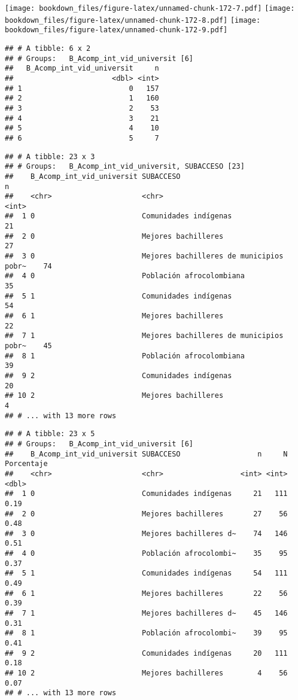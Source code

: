 \documentclass[]{article}
\theoremstyle{definition}
\theoremstyle{definition}
\theoremstyle{definition}
\theoremstyle{remark}
\begin{document}
\texttt{[image: bookdown\_files/figure-latex/unnamed-chunk-172-7.pdf]}
\texttt{[image: bookdown\_files/figure-latex/unnamed-chunk-172-8.pdf]}
\texttt{[image: bookdown\_files/figure-latex/unnamed-chunk-172-9.pdf]}

\begin{verbatim}
## # A tibble: 6 x 2
## # Groups:   B_Acomp_int_vid_universit [6]
##   B_Acomp_int_vid_universit     n
##                       <dbl> <int>
## 1                         0   157
## 2                         1   160
## 3                         2    53
## 4                         3    21
## 5                         4    10
## 6                         5     7
\end{verbatim}

\begin{verbatim}
## # A tibble: 23 x 3
## # Groups:   B_Acomp_int_vid_universit, SUBACCESO [23]
##    B_Acomp_int_vid_universit SUBACCESO                                   n
##    <chr>                     <chr>                                   <int>
##  1 0                         Comunidades indígenas                      21
##  2 0                         Mejores bachilleres                        27
##  3 0                         Mejores bachilleres de municipios pobr~    74
##  4 0                         Población afrocolombiana                   35
##  5 1                         Comunidades indígenas                      54
##  6 1                         Mejores bachilleres                        22
##  7 1                         Mejores bachilleres de municipios pobr~    45
##  8 1                         Población afrocolombiana                   39
##  9 2                         Comunidades indígenas                      20
## 10 2                         Mejores bachilleres                         4
## # ... with 13 more rows
\end{verbatim}

\begin{verbatim}
## # A tibble: 23 x 5
## # Groups:   B_Acomp_int_vid_universit [6]
##    B_Acomp_int_vid_universit SUBACCESO                  n     N Porcentaje
##    <chr>                     <chr>                  <int> <int>      <dbl>
##  1 0                         Comunidades indígenas     21   111       0.19
##  2 0                         Mejores bachilleres       27    56       0.48
##  3 0                         Mejores bachilleres d~    74   146       0.51
##  4 0                         Población afrocolombi~    35    95       0.37
##  5 1                         Comunidades indígenas     54   111       0.49
##  6 1                         Mejores bachilleres       22    56       0.39
##  7 1                         Mejores bachilleres d~    45   146       0.31
##  8 1                         Población afrocolombi~    39    95       0.41
##  9 2                         Comunidades indígenas     20   111       0.18
## 10 2                         Mejores bachilleres        4    56       0.07
## # ... with 13 more rows
\end{verbatim}
\end{document}
